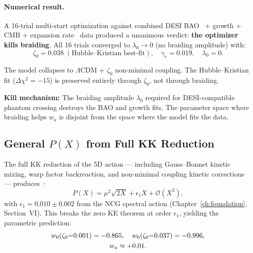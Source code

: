 \paragraph{Numerical result.} A 16-trial multi-start optimization against combined DESI BAO~\cite{ch3:desi2025} + growth + CMB + expansion rate~\cite{ch3:paper2} data produced a unanimous verdict: \textbf{the optimizer kills braiding}. All 16 trials converged to $\lambda_0 \to 0$ (no braiding amplitude) with:
\begin{equation}
  \zeta_0 = 0.038\;(\text{Hubble--Kristian best-fit}), \quad \gamma_r = 0.019, \quad \lambda_0 = 0.
  \label{eq:3-16}
\end{equation}

The model collapses to $\Lambda$CDM + $\zeta_0$ non-minimal coupling. The Hubble--Kristian fit ($\Delta\chi^2 = -15$) is preserved entirely through $\zeta_0$, not through braiding.

\textbf{Kill mechanism:} The braiding amplitude $\lambda_0$ required for DESI-compatible phantom crossing destroys the BAO and growth fits. The parameter space where braiding helps $w_a$ is disjoint from the space where the model fits the data.

\subsection{General $P(X)$ from Full KK Reduction}
\label{sec:3-generalpx}

The full KK reduction of the 5D action --- including Gauss--Bonnet kinetic mixing, warp factor backreaction, and non-minimal coupling kinetic corrections --- produces~\cite{ch3:paper1}:
\begin{equation}
  P(X) = \mu^2\sqrt{2X} + \epsilon_1 X + \mathcal{O}(X^2),
  \label{eq:3-17}
\end{equation}
with $\epsilon_1 = 0.010 \pm 0.002$ from the NCG spectral action (Chapter~\ref{ch:foundation}, Section~VI). This breaks the zero KE theorem at order $\epsilon_1$, yielding the parametric prediction:
\begin{gather}
  w_0(\zeta_0{=}0.001) = -0.865, \quad w_0(\zeta_0{=}0.037) = -0.996, \notag\\
  w_a \approx +0.01.
  \label{eq:3-18}
\end{gather}

